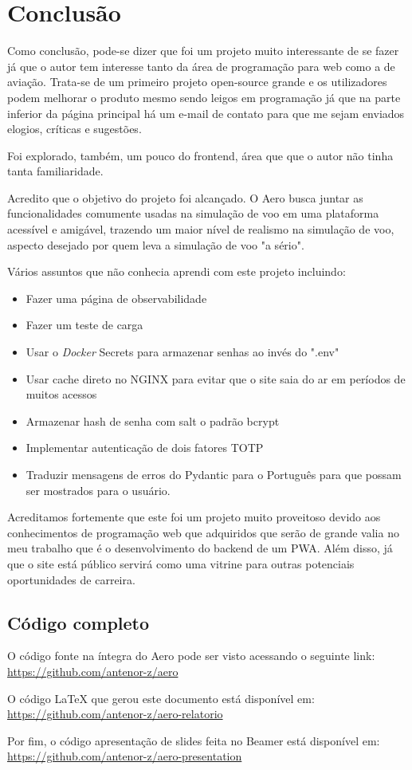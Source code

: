 \chapter{Conclusão}

Como conclusão, pode-se dizer que foi um projeto muito interessante de se fazer já que 
o autor tem interesse tanto da área de programação para web como a de aviação. Trata-se
de um primeiro 
projeto open-source grande e os utilizadores podem melhorar o produto mesmo sendo
leigos em programação já que na parte inferior da página principal há um e-mail 
de contato para que me sejam enviados elogios, críticas e sugestões.

Foi explorado, também, um pouco do frontend, área que que o autor não tinha tanta 
familiaridade.

Acredito que o objetivo do projeto foi alcançado. O Aero busca juntar as funcionalidades 
comumente usadas na simulação de voo em uma plataforma acessível e amigável, 
trazendo um maior nível de realismo na simulação de voo, aspecto desejado por quem leva
a simulação de voo "a sério".

Vários assuntos que não conhecia aprendi com este projeto incluindo:

\begin{itemize}
\item Fazer uma página de observabilidade
\item Fazer um teste de carga
\item Usar o \textit{Docker} Secrets para armazenar senhas ao invés do ".env"
\item Usar cache direto no NGINX para evitar que o site saia do ar em períodos 
de muitos acessos
\item Armazenar hash de senha com salt o padrão bcrypt
\item Implementar autenticação de dois fatores TOTP
\item Traduzir mensagens de erros do Pydantic para o Português para que possam 
ser mostrados para o usuário.
\end{itemize}

Acreditamos fortemente que este foi um projeto muito proveitoso devido aos 
conhecimentos de programação web que adquiridos que serão de grande valia no meu 
trabalho que é o desenvolvimento do backend de um PWA. Além disso, já que o site está público 
servirá como uma vitrine para outras potenciais oportunidades de carreira.

\section {Código completo}

O código fonte na íntegra do Aero pode ser visto acessando o seguinte link: \url{https://github.com/antenor-z/aero}

O código LaTeX que gerou este documento está disponível em: \url{https://github.com/antenor-z/aero-relatorio}

Por fim, o código apresentação de slides feita no Beamer está disponível em: \url{https://github.com/antenor-z/aero-presentation}